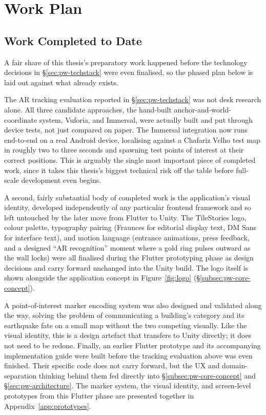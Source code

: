 %


\chapter{Work Plan}
\label{ch:work-plan}
 
\section{Work Completed to Date}
\label{sec:wp-completed}
 
A fair share of this thesis's preparatory work happened before the
technology decisions in \S\ref{sec:pw-techstack} were even finalised,
so the phased plan below is laid out against what already exists.

The AR tracking evaluation reported in \S\ref{sec:pw-techstack} was not
desk research alone. All three candidate approaches, the hand-built
anchor-and-world-coordinate system, Vuforia, and Immersal, were actually
built and put through device tests, not just compared on paper. The Immersal
integration now runs end-to-end on a real Android device, localising
against a Chafariz Velho test map in roughly two to three seconds and
spawning test points of interest at their correct positions. This is
arguably the single most important piece of completed work, since it
takes this thesis's biggest technical risk off the table before
full-scale development even begins.

A second, fairly substantial body of completed work is the application's
visual identity, developed independently of any particular frontend
framework and so left untouched by the later move from Flutter to Unity.
The TileStories logo, colour palette, typography pairing (Fraunces for
editorial display text, DM Sans for interface text), and motion language
(entrance animations, press feedback, and a designed ``AR recognition''
moment where a gold ring pulses outward as the wall locks) were all
finalised during the Flutter prototyping phase as design decisions and carry forward unchanged into
the Unity build. The logo itself is shown alongside the application
concept in Figure~\ref{fig:logo} (\S\ref{subsec:pw-core-concept}).

A point-of-interest marker encoding system was also designed and
validated along the way, solving the problem of communicating a
building's category and its earthquake fate on a small map without the
two competing visually. Like the visual identity, this is a design
artefact that transfers to Unity directly; it does not need to be
redone. Finally, an earlier Flutter prototype and its accompanying
implementation guide were built before the tracking evaluation above was
even finished. Their specific code does not carry forward, but the UX and
domain-separation thinking behind them fed directly into
\S\ref{subsec:pw-core-concept} and \S\ref{sec:pw-architecture}. The
marker system, the visual identity, and screen-level prototypes from
this Flutter phase are presented together in Appendix~\ref{app:prototypes}.

